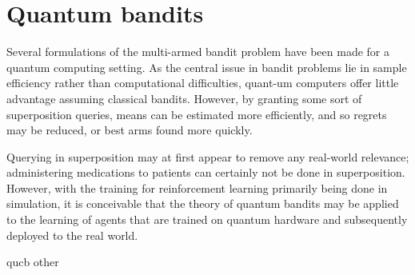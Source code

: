 \chapter{Quantum bandits}
\label{chap:qbandits}

Several formulations of the multi-armed bandit problem have been made for a quantum computing setting.
As the central issue in bandit problems lie in sample efficiency rather than computational difficulties, quant-um computers offer little advantage assuming classical bandits.
However, by granting some sort of superposition queries, means can be estimated more efficiently, and so regrets may be reduced, or best arms found more quickly.

Querying in superposition may at first appear to remove any real-world relevance; administering medications to patients can certainly not be done in superposition.
However, with the training for reinforcement learning primarily being done in simulation, it is conceivable that the theory of quantum bandits may be applied to the learning of agents that are trained on quantum hardware and subsequently deployed to the real world.

{qucb}
{other}